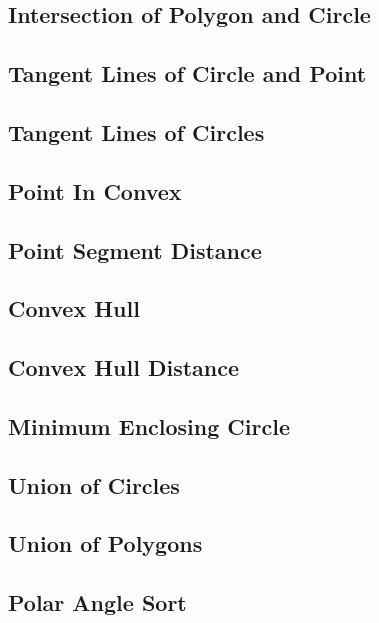 \subsection{Intersection of Polygon and Circle}

\subsection{Tangent Lines of Circle and Point}

\subsection{Tangent Lines of Circles}

\subsection{Point In Convex}

\subsection{Point Segment Distance}

\subsection{Convex Hull}

\subsection{Convex Hull Distance}

\subsection{Minimum Enclosing Circle}

\subsection{Union of Circles}

\subsection{Union of Polygons}

\subsection{Polar Angle Sort}

